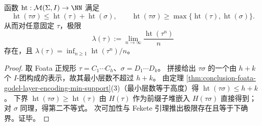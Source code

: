 \begin{proposition}[因果高度的次可加性与稳定支撑率]\label{prop:conclusion-trace-height-subadditivity-stable-rate}
函数 \(\operatorname{ht}:\mathcal M(\Sigma,I)\to\NN\) 满足
\[
\operatorname{ht}(\tau\sigma)\le \operatorname{ht}(\tau)+\operatorname{ht}(\sigma),
\qquad
\operatorname{ht}(\tau\sigma)\ge \max\{\operatorname{ht}(\tau),\operatorname{ht}(\sigma)\}.
\]
从而对任意固定 \(\tau\)，极限
\[
\lambda(\tau):=\lim_{n\to\infty}\frac{\operatorname{ht}(\tau^n)}{n}
\]
存在，且
\(
\lambda(\tau)=\inf_{n\ge 1}\operatorname{ht}(\tau^n)/n
\)。
\end{proposition}
\begin{proof}
取 Foata 正规形 \(\tau=C_1\cdots C_h\)、\(\sigma=D_1\cdots D_k\)。
拼接给出 \(\tau\sigma\) 的一个由 \(h+k\) 个 \(I\)-团构成的表示，故其最小层数不超过 \(h+k\)。
由定理 \ref{thm:conclusion-foata-godel-layer-encoding-min-support}(3)（最小层数等于高度）得 \(\operatorname{ht}(\tau\sigma)\le h+k\)。
下界 \(\operatorname{ht}(\tau\sigma)\ge\operatorname{ht}(\tau)\) 由 \(H(\tau)\) 作为前缀子堆嵌入 \(H(\tau\sigma)\) 直接得到；对 \(\sigma\) 同理，得第二不等式。
次可加性与 Fekete 引理推出极限存在且等于下确界。证毕。
\end{proof}

